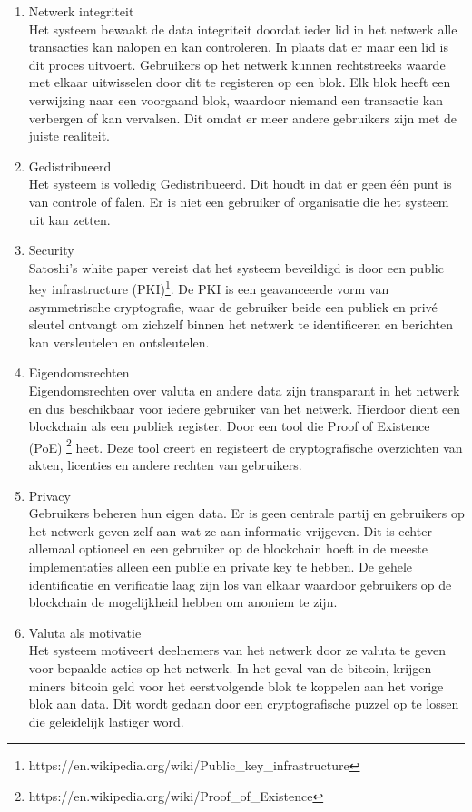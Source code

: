 \begin{enumerate}
	\item Netwerk integriteit\\
	Het systeem bewaakt de data integriteit doordat ieder lid in het netwerk alle transacties kan nalopen en kan controleren. In plaats dat er maar een lid is dit proces uitvoert. Gebruikers op het netwerk kunnen rechtstreeks waarde met elkaar uitwisselen door dit te registeren op een blok. Elk blok heeft een verwijzing naar een voorgaand blok, waardoor niemand een transactie kan verbergen of kan vervalsen. Dit omdat er meer andere gebruikers zijn met de juiste realiteit.
	\item Gedistribueerd\\
	Het systeem is volledig Gedistribueerd. Dit houdt in dat er geen één punt is van controle of falen. Er is niet een gebruiker of organisatie die het systeem uit kan zetten.
	\item Security\\
	Satoshi’s white paper \cite{bitcoinPaper} vereist dat het systeem beveildigd is door een public key infrastructure (PKI)\footnote{https://en.wikipedia.org/wiki/Public\_key\_infrastructure}. De PKI is een geavanceerde vorm van asymmetrische cryptografie, waar de gebruiker beide een publiek en privé sleutel ontvangt om zichzelf binnen het netwerk te identificeren en berichten kan versleutelen en ontsleutelen.
	\item Eigendomsrechten\\
	Eigendomsrechten over valuta en andere data zijn transparant in het netwerk en dus beschikbaar voor iedere gebruiker van het netwerk. Hierdoor dient een blockchain als een publiek register. Door een tool die Proof of Existence (PoE) \footnote{https://en.wikipedia.org/wiki/Proof\_of\_Existence} heet. Deze tool creert en registeert de cryptografische overzichten van akten, licenties en andere rechten van gebruikers.
	\item Privacy\\
	Gebruikers beheren hun eigen data. Er is geen centrale partij en gebruikers op het netwerk geven zelf aan wat ze aan informatie vrijgeven. Dit is echter allemaal optioneel en een gebruiker op de blockchain hoeft in de meeste implementaties alleen een publie en private key te hebben. De gehele identificatie en verificatie laag zijn los van elkaar waardoor gebruikers op de blockchain de mogelijkheid hebben om anoniem te zijn.	
	\item Valuta als motivatie\\
	Het systeem motiveert deelnemers van het netwerk door ze valuta te geven voor bepaalde acties op het netwerk. In het geval van de bitcoin, krijgen miners bitcoin geld voor het eerstvolgende blok te koppelen aan het vorige blok aan data. Dit wordt gedaan door een cryptografische puzzel op te lossen die geleidelijk lastiger word.
\end{enumerate}
\newpage


